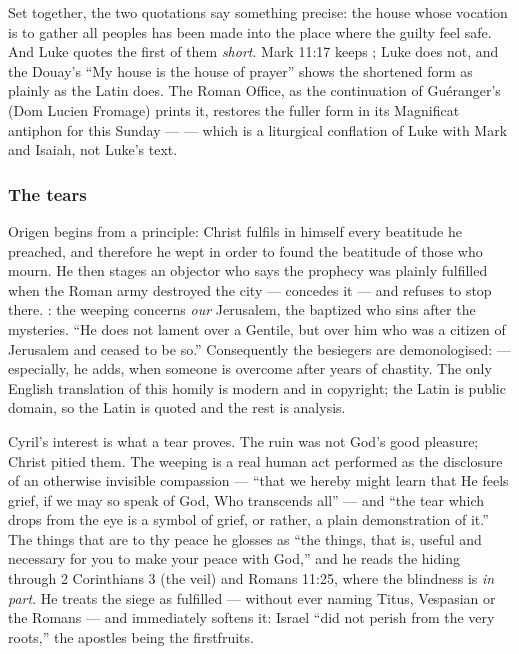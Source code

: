 Set together, the two quotations say something precise: the house whose
vocation is to gather all peoples has been made into the place where the
guilty feel safe. And Luke quotes the first of them \textit{short}. Mark
11:17 keeps ; Luke does not, and the Douay's ``My
house is the house of prayer'' shows the shortened form as plainly as the
Latin does. The Roman Office, as the continuation of Guéranger's  (Dom Lucien Fromage) prints it, restores the fuller form in
its Magnificat antiphon for this Sunday ---  --- which is a liturgical conflation of Luke with Mark and Isaiah,
not Luke's text.

\subsubsection*{The tears}

\begin{witnessnote}
Origen begins from a principle: Christ fulfils in himself every beatitude he
preached, and therefore he wept in order to found the beatitude of those who
mourn. He then stages an objector who says the prophecy was plainly fulfilled
when the Roman army destroyed the city --- concedes it --- and refuses to
stop there. : the weeping
concerns \textit{our} Jerusalem, the baptized who sins after the mysteries.
``He does not lament over a Gentile, but over him who was a citizen of
Jerusalem and ceased to be so.'' Consequently the besiegers are
demonologised:  --- especially, he adds, when someone is
overcome after years of chastity. The only English translation of this
homily is modern and in copyright; the Latin is
public domain, so the Latin is quoted and the rest is analysis.
\end{witnessnote}

\begin{witnessnote}
Cyril's interest is what a tear proves. The ruin was not God's good pleasure;
Christ pitied them. The weeping is a real human act performed as the
disclosure of an otherwise invisible compassion --- ``that we hereby might
learn that He feels grief, if we may so speak of God, Who transcends all''
--- and ``the tear which drops from the eye is a symbol of grief, or rather, a
plain demonstration of it.'' The things that are to thy peace he glosses as
``the things, that is, useful and necessary for you to make your peace with
God,'' and he reads the hiding through 2 Corinthians 3 (the veil) and Romans
11:25, where the blindness is \textit{in part}. He treats the siege as
fulfilled --- without ever naming Titus, Vespasian or the Romans --- and
immediately softens it: Israel ``did not perish from the very roots,'' the
apostles being the firstfruits.
\end{witnessnote}

